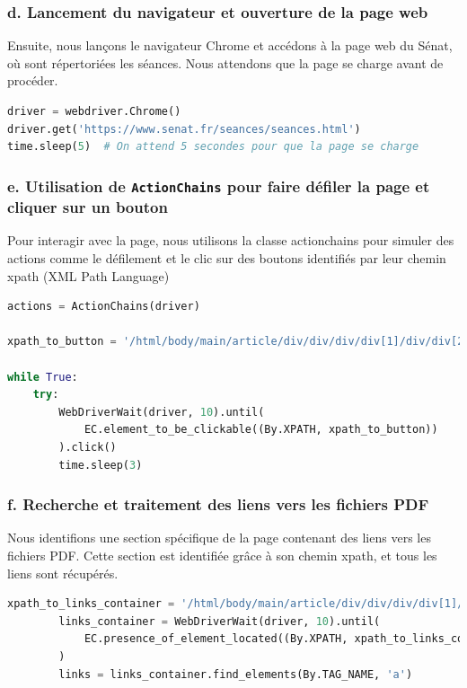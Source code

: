 \subsubsection{d. Lancement du navigateur et ouverture de la page web}

Ensuite, nous lançons le navigateur Chrome et accédons à la page web du Sénat, où sont répertoriées les séances. Nous attendons que la page se charge avant de procéder.

\begin{lstlisting}[language=Python]
driver = webdriver.Chrome()
driver.get('https://www.senat.fr/seances/seances.html')
time.sleep(5)  # On attend 5 secondes pour que la page se charge
\end{lstlisting}

\subsubsection{e. Utilisation de \texttt{ActionChains} pour faire défiler la page et cliquer sur un bouton}

Pour interagir avec la page, nous utilisons la classe \gls{actionchains} pour simuler des actions comme le défilement et le clic sur des boutons identifiés par leur chemin \gls{xpath} (XML Path Language)

\begin{lstlisting}[language=Python]
actions = ActionChains(driver)

xpath_to_button = '/html/body/main/article/div/div/div/div[1]/div/div[2]/div[1]/div/div/div[3]/h2/button'

while True:
    try:
        WebDriverWait(driver, 10).until(
            EC.element_to_be_clickable((By.XPATH, xpath_to_button))
        ).click()
        time.sleep(3)
\end{lstlisting}

\subsubsection{f. Recherche et traitement des liens vers les fichiers PDF}

Nous identifions une section spécifique de la page contenant des liens vers les fichiers \gls{PDF}. Cette section est identifiée grâce à son chemin \gls{xpath}, et tous les liens sont récupérés.

\begin{lstlisting}[language=Python]
        xpath_to_links_container = '/html/body/main/article/div/div/div/div[1]/div/div[2]/div[1]/div/div/div[3]'
        links_container = WebDriverWait(driver, 10).until(
            EC.presence_of_element_located((By.XPATH, xpath_to_links_container))
        )
        links = links_container.find_elements(By.TAG_NAME, 'a')
\end{lstlisting}

